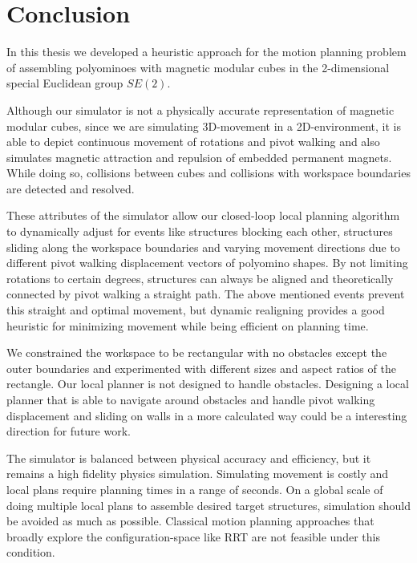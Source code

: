 \chapter{Conclusion}
\label{chap:conclusion}

In this thesis we developed a heuristic approach for the motion planning problem of assembling polyominoes with magnetic modular cubes \cite{Bhattacharjee2022} in the 2-dimensional special Euclidean group $\textit{SE}(2)$.

Although our simulator is not a physically accurate representation of magnetic modular cubes, since we are simulating 3D-movement in a 2D-environment, it is able to depict continuous movement of rotations and pivot walking and also simulates magnetic attraction and repulsion of embedded permanent magnets.
While doing so, collisions between cubes and collisions with workspace boundaries are detected and resolved.

These attributes of the simulator allow our closed-loop local planning algorithm to dynamically adjust for events like structures blocking each other, structures sliding along the workspace boundaries and varying movement directions due to different pivot walking displacement vectors of polyomino shapes.
By not limiting rotations to certain degrees, structures can always be aligned and theoretically connected by pivot walking a straight path.
The above mentioned events prevent this straight and optimal movement, but dynamic realigning provides a good heuristic for minimizing movement while being efficient on planning time.

We constrained the workspace to be rectangular with no obstacles except the outer boundaries and experimented with different sizes and aspect ratios of the rectangle.
Our local planner is not designed to handle obstacles.
Designing a local planner that is able to navigate around obstacles and handle pivot walking displacement and sliding on walls in a more calculated way could be a interesting direction for future work.

The simulator is balanced between physical accuracy and efficiency, but it remains a high fidelity physics simulation.
Simulating movement is costly and local plans require planning times in a range of seconds.
On a global scale of doing multiple local plans to assemble desired target structures, simulation should be avoided as much as possible.
Classical motion planning approaches that broadly explore the configuration-space like RRT are not feasible under this condition.

